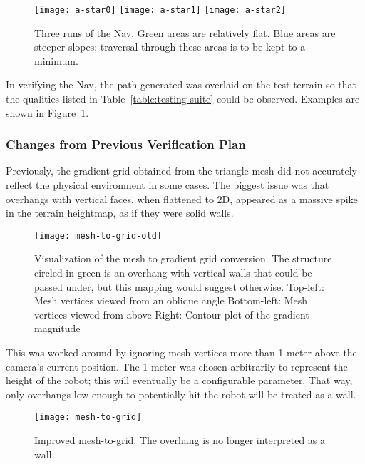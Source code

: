 \begin{figure}[htbp]
    \centering
    \texttt{[image: a-star0]}
    \texttt{[image: a-star1]}
    \texttt{[image: a-star2]}
    \caption{
        Three runs of the Nav. Green areas are relatively flat. Blue areas are steeper slopes; traversal through these
        areas is to be kept to a minimum.
    }\label{fig:nav-tests}
\end{figure}

In verifying the Nav, the path generated was overlaid on the test terrain so that the qualities listed in
Table~\ref{table:testing-suite} could be observed. Examples are shown in Figure~\ref{fig:nav-tests}.

\subsubsection{Changes from Previous Verification Plan}\label{subsubsec:changes-to-plan}
Previously, the gradient grid obtained from the triangle mesh did not accurately reflect the physical environment in
some cases.
The biggest issue was that overhangs with vertical faces, when flattened to 2D, appeared as a massive spike in the
terrain heightmap, as if they were solid walls.

\begin{figure}[htbp]
    \centering
    \texttt{[image: mesh-to-grid-old]}
    \caption{
        Visualization of the mesh to gradient grid conversion. The structure circled in green is an overhang with vertical walls that could be passed under, but this mapping would suggest otherwise.\linebreak
        Top-left: Mesh vertices viewed from an oblique angle\linebreak
        Bottom-left: Mesh vertices viewed from above\linebreak
        Right: Contour plot of the gradient magnitude
    }
\end{figure}

This was worked around by ignoring mesh vertices more than 1 meter above the camera's current position.
The 1 meter was chosen arbitrarily to represent the height of the robot; this will eventually be a configurable
parameter.
That way, only overhangs low enough to potentially hit the robot will be treated as a wall.

\begin{figure}[htbp]
    \centering
    \texttt{[image: mesh-to-grid]}
    \caption{Improved mesh-to-grid. The overhang is no longer interpreted as a wall.}
\end{figure}